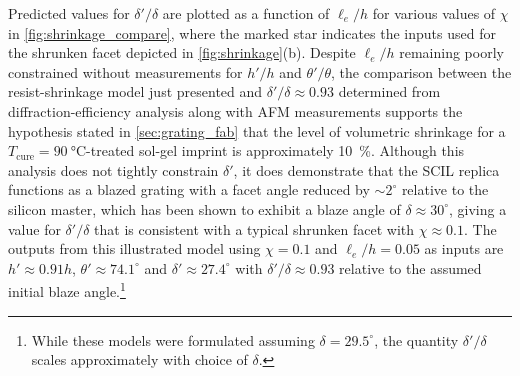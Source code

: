 Predicted values for $\delta' / \delta$ are plotted as a function of $\ell_e / h$ for various values of $\chi$ in \cref{fig:shrinkage_compare}, where the marked star indicates the inputs used for the shrunken facet depicted in \cref{fig:shrinkage}(b). 
Despite $\ell_e / h$ remaining poorly constrained without measurements for $h'/h$ and $\theta' / \theta$, the comparison between the resist-shrinkage model just presented and $\delta' / \delta \approx 0.93$ determined from diffraction-efficiency analysis along with AFM measurements supports the hypothesis stated in \cref{sec:grating_fab} that the level of volumetric shrinkage for a $T_{\text{cure}} = \SI{90}{\celsius}$-treated sol-gel imprint is approximately \SI{10}{\percent}.  
Although this analysis does not tightly constrain $\delta'$, it does demonstrate that the SCIL replica functions as a blazed grating with a facet angle reduced by $\sim 2^{\circ}$ relative to the silicon master, which has been shown to exhibit a blaze angle of $\delta \approx 30^{\circ}$, giving a value for $\delta' / \delta$ that is consistent with a typical shrunken facet with $\chi \approx 0.1$. 
The outputs from this illustrated model using $\chi = 0.1$ and $\ell_e / h = 0.05$ as inputs are $h' \approx 0.91 h$, $\theta' \approx 74.1^{\circ}$ and $\delta' \approx 27.4^{\circ}$ with $\delta' / \delta \approx 0.93$ relative to the assumed initial blaze angle.\footnote{While these models were formulated assuming $\delta = 29.5^{\circ}$, the quantity $\delta' / \delta$ scales approximately with choice of $\delta$.} 

